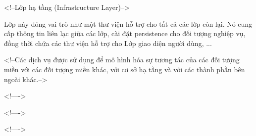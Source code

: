 <!--Lớp hạ tầng (Infrastructure Layer)-->

Lớp này đóng vai trò như một thư viện hỗ trợ cho tất cả các lớp còn lại. Nó cung cấp thông tin liên lạc giữa các lớp, cài đặt persistence cho đối tượng nghiệp vụ, đồng thời chứa các thư viện hỗ trợ cho Lớp giao diện người dùng, ...





<!--Các dịch vụ được sử dụng để mô hình hóa sự tương tác của các đối tượng miền với các đối tượng miền khác, với cơ sở hạ tầng và với các thành phần bên ngoài khác.-->


<!---->

<!---->

<!---->